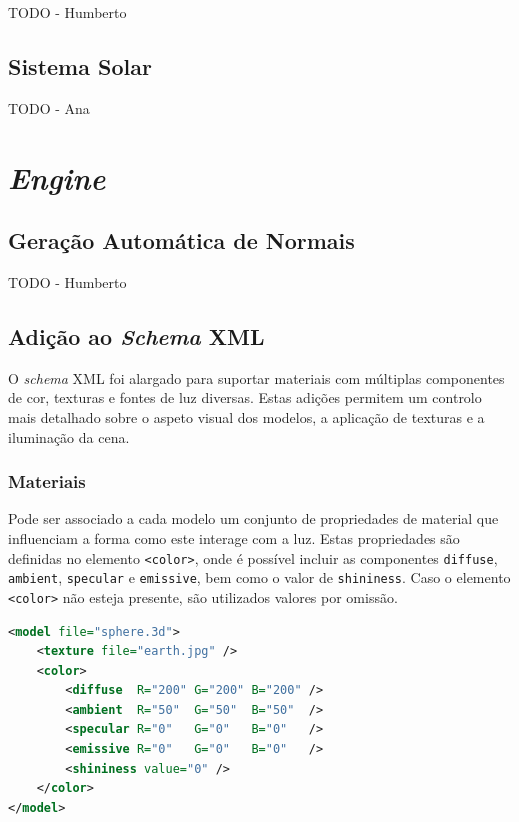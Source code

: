 \documentclass[12pt, a4paper]{article}
\begin{document}
{\color{red} TODO - Humberto}

\subsection{Sistema Solar}

{\color{red} TODO - Ana}

\section{\emph{Engine}}

\subsection{Geração Automática de Normais}

{\color{red} TODO - Humberto}

\subsection{Adição ao \emph{Schema} XML}

O \emph{schema} XML foi alargado para suportar materiais com múltiplas componentes de cor, texturas
e fontes de luz diversas. Estas adições permitem um controlo mais detalhado sobre o aspeto visual
dos modelos, a aplicação de texturas e a iluminação da cena.

\subsubsection{Materiais}

Pode ser associado a cada modelo um conjunto de propriedades de material que influenciam a forma
como este interage com a luz. Estas propriedades são definidas no elemento \texttt{<color>}, onde é
possível incluir as componentes \texttt{diffuse}, \texttt{ambient}, \texttt{specular} e
\texttt{emissive}, bem como o valor de \texttt{shininess}. Caso o elemento \texttt{<color>} não
esteja presente, são utilizados valores por omissão.

\begin{lstlisting}[language=xml]
<model file="sphere.3d">
    <texture file="earth.jpg" />
    <color>
        <diffuse  R="200" G="200" B="200" />
        <ambient  R="50"  G="50"  B="50"  />
        <specular R="0"   G="0"   B="0"   />
        <emissive R="0"   G="0"   B="0"   />
        <shininess value="0" />
    </color>
</model>
\end{lstlisting}
\end{document}
